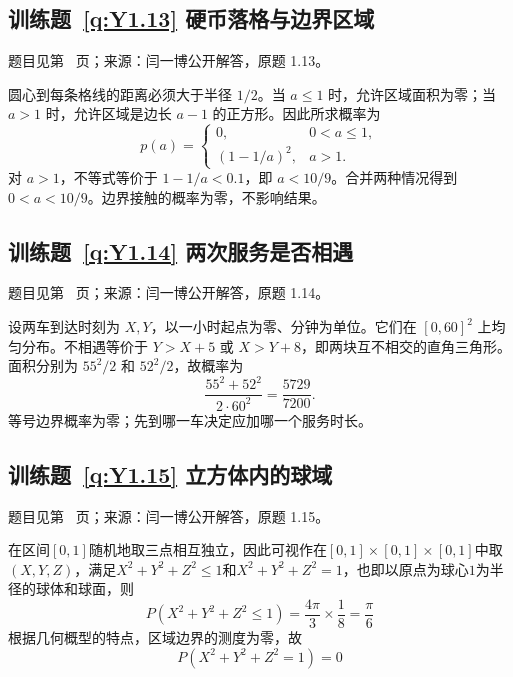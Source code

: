 \subsection*{训练题~\ref{q:Y1.13} 硬币落格与边界区域}\label{a:Y1.13}{\small 题目见第~\pageref{q:Y1.13} 页；来源：闫一博公开解答，原题 1.13。}
\begin{solve}圆心到每条格线的距离必须大于半径 $1/2$。当 $a\le1$ 时，允许区域面积为零；当 $a>1$ 时，允许区域是边长 $a-1$ 的正方形。因此所求概率为\[p(a)=\begin{cases}0,&0<a\le1,\\(1-1/a)^2,&a>1.\end{cases}\]对 $a>1$，不等式等价于 $1-1/a<0.1$，即 $a<10/9$。合并两种情况得到 $0<a<10/9$。边界接触的概率为零，不影响结果。\end{solve}

\subsection*{训练题~\ref{q:Y1.14} 两次服务是否相遇}\label{a:Y1.14}{\small 题目见第~\pageref{q:Y1.14} 页；来源：闫一博公开解答，原题 1.14。}
\begin{solve}设两车到达时刻为 $X,Y$，以一小时起点为零、分钟为单位。它们在 $[0,60]^2$ 上均匀分布。不相遇等价于 $Y>X+5$ 或 $X>Y+8$，即两块互不相交的直角三角形。面积分别为 $55^2/2$ 和 $52^2/2$，故概率为\[\frac{55^2+52^2}{2\cdot60^2}=\frac{5729}{7200}.\]等号边界概率为零；先到哪一车决定应加哪一个服务时长。\end{solve}

\subsection*{训练题~\ref{q:Y1.15} 立方体内的球域}\label{a:Y1.15}{\small 题目见第~\pageref{q:Y1.15} 页；来源：闫一博公开解答，原题 1.15。}
\begin{solve}
  在区间$[0,1]$随机地取三点相互独立，因此可视作在$[0,1]\times [0,1]\times [0,1]$中取$(X,Y,Z)$，满足$X^2+Y^2+Z^2\leqslant 1$和$X^2+Y^2+Z^2=1$，也即以原点为球心$1$为半径的球体和球面，则
\[
P(X^2+Y^2+Z^2\leqslant 1)=\frac{4\pi}{3}\times\frac{1}{8}=\frac{\pi}{6}
\]
根据几何概型的特点，区域边界的测度为零，故
\[
P(X^2+Y^2+Z^2=1)=0
\]  
\end{solve}

